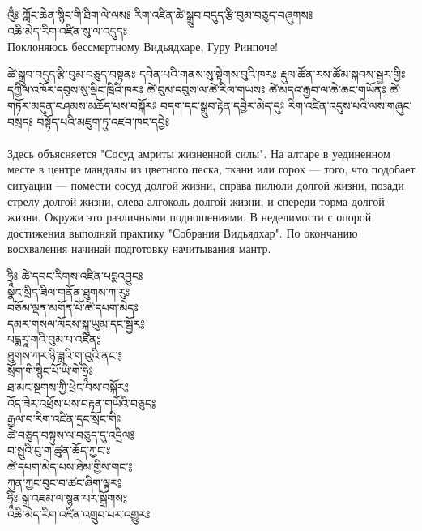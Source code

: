 \ru
\newpage
\ru
{}
{\ti འུྃཿ ཀློང་ཆེན་སྙིང་གི་ཐིག་ལེ་ལསཿ རིག་འཛིན་ཚེ་སྒྲུབ་བདུད་རྩི་བུམ་བཅུད་བཞུགསཿ }\\

{\ti འཆི་མེད་རིག་འཛིན་སུ་ལ་འདུདཿ }\\
Поклоняюсь бессмертному Видьядхаре, Гуру Ринпоче!

{\ti ཚེ་སྒྲུབ་བདུད་རྩི་བུམ་བཅུད་བསྟནཿ དབེན་པའི་གནས་སུ་སྟེགས་བུའི་ཁརཿ རྡུལ་ཚོན་རས་ཚོམ་སྐབས་སྦྱར་གྱིཿ དཀྱིལ་འཁོར་དབུས་སུ་ལྡིང་ཁྲིའི་ཁརཿ ཚེ་བུམ་དབུས་ལ་ཚེ་རིལ་གཡསཿ ཚེ་མདའ་རྒྱབ་ལ་ཆེ་ཆང་གཡོནཿ ཚེ་གཏོར་མདུན་བཤམས་མཆོད་པས་བསྐོརཿ བདག་དང་སྒྲུབ་རྟེན་དབྱེར་མེད་དུཿ རིག་འཛིན་འདུས་པའི་ལས་གཞུང་བསྲདཿ བསྟོད་པའི་མཇུག་ཏུ་འཛབ་ཁང་དབྱེཿ }\\\\
Здесь объясняется "Сосуд амриты жизненной силы". На алтаре в уединенном месте в центре мандалы из цветного песка, ткани или горок — того, что подобает ситуации — помести сосуд долгой жизни, справа пилюли долгой жизни, позади стрелу долгой жизни, слева алгоколь долгой жизни, и спереди торма долгой жизни. Окружи это различными подношениями. В неделимости с опорой достижения выполняй практику "Собрания Видьядхар". По окончанию восхваления начинай подготовку начитывания мантр. 

{\ti
ཧྲཱིཿ ཚེ་དབང་རིགས་འཛིན་པདྨའབྱུངཿ \\
སྣང་སྲིད་ཟིལ་གནོན་ཐུགས་ཀ་རུཿ \\
བཅོམ་ལྡན་མགོན་པོ་ཚེ་དཔག་མེདཿ \\
དམར་གསལ་ལོངས་སྐུ་ཡུམ་དང་སྦྱོར༔ \\
པདྨརཱ་གའི་བུམ་པ་འཛིན༔ \\
ཐུགས་ཀར་ཉི་ཟླའི་གྭ་འུའི་ནང་༔ \\
སྲོག་གི་སྙིང་པོ་ཡི་གེ་ཧྲཱིཿ \\
ཐ་མང་སྔགས་ཀྱི་ཕྲེང་བས་བསྐོར༔ \\
འོད་ཟེར་འཕྲོས་པས་བརྟན་གཡོའི་བཅུད༔ \\
རྒྱལ་བ་རིག་འཛིན་དྲང་སྲོང་གིཿ \\
ཚེ་བཅུད་བསྟུས་ལ་བཅུད་དུ་འདྲིལ༔ \\
བ་སྤུའི་བུ་ག་ཚུན་ཆོད་ཀྱང་ཿ \\
ཚེ་དཔག་མེད་པས་ཐེམ་གྱིས་གང་༔ \\
ཀུན་ཀྱང་བུང་བ་ཚང་ཞིག་ལྟར༔\\
ཧྲཱིཿ སྒྲ་འཇམ་ལ་སྙན་པར་སྒྲོགས༔ \\
འཆི་མེད་རིག་འཛིན་འགྲུབ་པར་འགྱུརཿ \\
}\\

